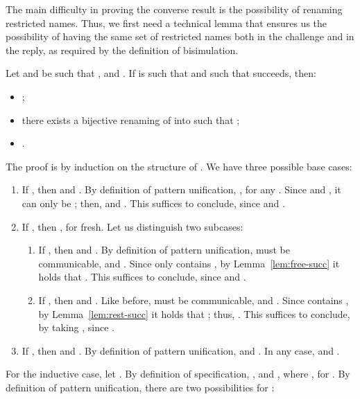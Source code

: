 \documentclass{LMCS}
\begin{document}
The main difficulty in proving the converse result is the possibility of renaming restricted names. 
Thus, we first need a technical lemma that ensures us the possibility of having the same set of restricted 
names both in the challenge and in the reply, as required by the definition of bisimulation.

\begin{lem}
\label{lem:reply-rename}
Let  and  be such that ,  and
. If  is such that  and
 such that  succeeds, then:
\begin{itemize}
\item ; 
\item there exists a bijective renaming  of  into 
such that ;
\item .
\end{itemize}
\end{lem}
\proof
The proof is by induction on the structure of . We have three possible base cases:
\begin{enumerate}
	\item If , then  and . By definition of pattern unification,
		, for any . Since  and ,
		it can only be ; then,  and . This suffices to conclude,
		since  and
		.
	\item If , then , for  fresh. Let us distinguish two subcases:
		\begin{enumerate}
		\item If , then  and . By definition of pattern unification,
                   must be communicable,  and .  Since  only
                  contains , by
                  Lemma~\ref{lem:free-succ} it holds that . This suffices to conclude, since
                   and .

		\item If , then  and . Like before,
		 must be communicable,  and . 
		Since  contains ,
		by Lemma~\ref{lem:rest-succ} it holds that ;
		thus, .
		This suffices to conclude, by taking , since . 
		\end{enumerate}
	\item If , then  and . By definition of pattern unification,
		 and . In any case, 
		 and
		.
\end{enumerate}
For the inductive case, let . By definition of specification,
,  and , where
, for . 
By definition of pattern unification, there are two possibilities for :
\end{document}
